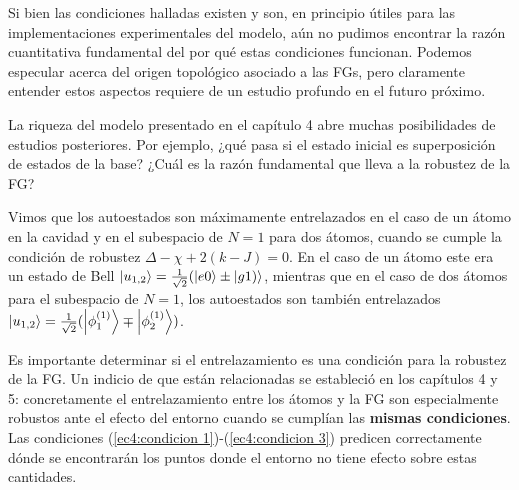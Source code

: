 Si bien las condiciones halladas existen y son, en principio útiles para las implementaciones experimentales del modelo, aún no pudimos encontrar la razón cuantitativa fundamental del por qué estas condiciones funcionan. Podemos especular acerca del origen topológico asociado a las FGs, pero  claramente entender estos aspectos requiere de un estudio profundo en el futuro próximo. 

La riqueza del modelo presentado en el capítulo 4 abre muchas posibilidades de estudios posteriores. Por ejemplo, ¿qué pasa si el estado inicial es superposición de estados de la base? ¿Cuál es la razón fundamental que lleva a la robustez de la FG? 


Vimos que los autoestados son máximamente entrelazados en el caso de un átomo en la cavidad y en  el subespacio de $N=1$ para dos átomos, cuando se cumple la condición de robustez $\Delta-\chi+2(k-J)=0$. En el caso de un átomo este era un estado de Bell $\ket{u_{1,2}}=\frac{1}{\sqrt{2}}(\ket{e0}\pm\ket{g1)}$, mientras que  en el caso de dos átomos para el subespacio de $N=1$, los autoestados son también entrelazados $\ket{u_{1,2}}=\frac{1}{\sqrt{2}}(\ket{\phi_1^{(1)}}\mp\ket{\phi_2^{(1)}})$.

Es importante determinar si el entrelazamiento es una condición  para la robustez de la FG. Un indicio de que están relacionadas se estableció en los capítulos 4 y 5: concretamente el entrelazamiento entre los átomos y la FG son especialmente robustos ante el efecto del entorno cuando se cumplían las \textbf{mismas condiciones}. Las condiciones (\ref{ec4:condicion 1})-(\ref{ec4:condicion 3}) predicen correctamente dónde se encontrarán los puntos donde el entorno no tiene efecto sobre estas cantidades.



